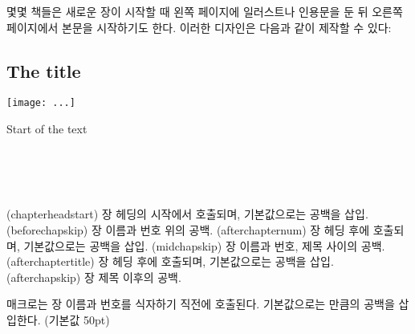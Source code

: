 몇몇 책들은 새로운 장이 시작할 때 왼쪽 페이지에 일러스트나
인용문을 둔 뒤 오른쪽 페이지에서 본문을 시작하기도 한다.
이러한 디자인은 다음과 같이 제작할 수 있다:
\begin{lcode}
\openleft                %
\chapter{The title}      %
\begin{centering}        %
\texttt{[image: ...]}
\end{centering}
\clearpage               %
Start of the text        %
\end{lcode}


\begin{syntax}
\cmd{\chapterheadstart} \lnc{\beforechapskip} \\ 
\cmd{\afterchapternum} \lnc{\midchapskip} \\
\cmd{\afterchaptertitle} \lnc{\afterchapskip} \\
\end{syntax}
\glossary(chapterheadstart)%
  {}%
  {장 헤딩의 시작에서 호출되며, 기본값으로는  공백을 삽입.}
\glossary(beforechapskip)%
  {}%
  {장 이름과 번호 위의 공백.}
\glossary(afterchapternum)%
  {}%
  {장 헤딩 후에 호출되며, 기본값으로는  공백을 삽입.}
\glossary(midchapskip)%
  {}%
  {장 이름과 번호, 제목 사이의 공백.}
\glossary(afterchaptertitle)%
  {}%
  {장 헤딩 후에 호출되며, 기본값으로는  공백을 삽입.}
\glossary(afterchapskip)%
  {}%
  {장 제목 이후의 공백.}

\cmd{\chapterheadstart} 매크로는 장 이름과 번호를 식자하기 직전에 호출된다.
기본값으로는 \lnc{\beforechapskip} 만큼의 공백을 삽입한다. (기본값 50pt)

